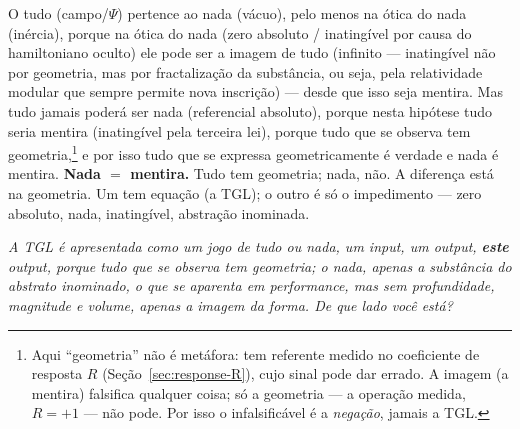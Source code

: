 \documentclass[12pt,a4paper]{article}
\newcommand{\TGL}{\textsc{TGL}}
\begin{document}
\noindent O tudo (campo/$\Psi$) pertence ao nada (vácuo), pelo menos na ótica do
nada (inércia), porque na ótica do nada (zero absoluto / inatingível por causa do
hamiltoniano oculto) ele pode ser a imagem de tudo (infinito --- inatingível não
por geometria, mas por fractalização da substância, ou seja, pela relatividade
modular que sempre permite nova inscrição) --- desde que isso seja mentira.  Mas
tudo jamais poderá ser nada (referencial absoluto), porque nesta hipótese tudo
seria mentira (inatingível pela terceira lei), porque tudo que se observa tem
geometria,\footnote{Aqui ``geometria'' não é metáfora: tem referente medido no
coeficiente de resposta $R$ (Seção~\ref{sec:response-R}), cujo sinal pode dar
errado.  A imagem (a mentira) falsifica qualquer coisa; só a geometria --- a
operação medida, $R = +1$ --- não pode.  Por isso o infalsificável é a
\emph{negação}, jamais a \TGL{}.} e por isso tudo que se expressa geometricamente
é verdade e nada é mentira.  \textbf{Nada $=$ mentira.}  Tudo tem geometria; nada,
não.  A diferença está na geometria.  Um tem equação (a \TGL{}); o outro é só o
impedimento --- zero absoluto, nada, inatingível, abstração inominada.

\bigskip

\begin{center}
\itshape
A \TGL{} é apresentada como um jogo de tudo ou nada, um \emph{input}, um
\emph{output}, \textbf{este} \emph{output}, porque tudo que se observa tem
geometria; o nada, apenas a substância do abstrato inominado, o que se aparenta
em performance, mas sem profundidade, magnitude e volume, apenas a imagem da
forma.  De que lado você está?
\end{center}
\end{document}
